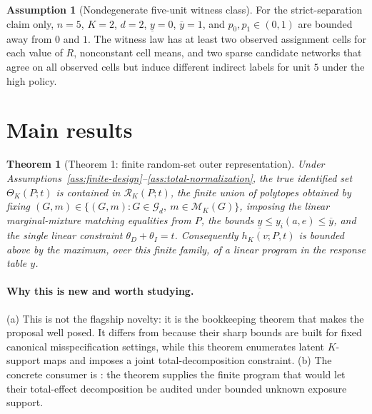 \documentclass[11pt]{article}
\theoremstyle{definition}
\newtheorem{assumption}{Assumption}
\theoremstyle{plain}
\newtheorem{theorem}{Theorem}
\theoremstyle{remark}
\begin{document}
\begin{assumption}[Nondegenerate five-unit witness class]\label{ass:witness-class}
For the strict-separation claim only, \(n=5\), \(K=2\), \(d=2\),
\(\underline y=0\), \(\overline y=1\), and \(p_0,p_1\in(0,1)\) are bounded away
from \(0\) and \(1\).  The witness law has at least two observed assignment
cells for each value of \(R\), nonconstant cell means, and two sparse candidate
networks that agree on all observed cells but induce different indirect labels
for unit \(5\) under the high policy.
\end{assumption}

\section{Main results}
\begin{theorem}[Theorem 1: finite random-set outer representation]\label{thm:finite-random-set-outer}
Under Assumptions~\ref{ass:finite-design}--\ref{ass:total-normalization}, the
true identified set \(\Theta_K(P;t)\) is contained in \(\mathcal R_K(P;t)\), the
finite union of polytopes obtained
by fixing \((G,m)\in\{(G,m):G\in\mathcal G_d,\ m\in\mathcal M_K(G)\}\), imposing
the linear marginal-mixture matching equalities from \(P\), the bounds
\(\underline y\le y_i(a,e)\le\overline y\), and the single linear constraint
\(\theta_D+\theta_I=t\).  Consequently \(h_K(v;P,t)\) is bounded above by the
maximum, over this finite family, of a linear program in the response table
\(y\).
\end{theorem}
\paragraph{Why this is new and worth studying.}
(a) This is not the flagship novelty: it is the bookkeeping theorem that makes
the proposal well posed.  It differs from \citet{SchroderOprescuFeuerriegelKallus2026}
because their sharp bounds are built for fixed canonical misspecification
settings, while this theorem enumerates latent \(K\)-support maps and imposes a
joint total-decomposition constraint.  (b) The concrete consumer is
\citet{HuLiWager2022}: the theorem supplies the finite program that would let
their total-effect decomposition be audited under bounded unknown exposure
support.
\end{document}
